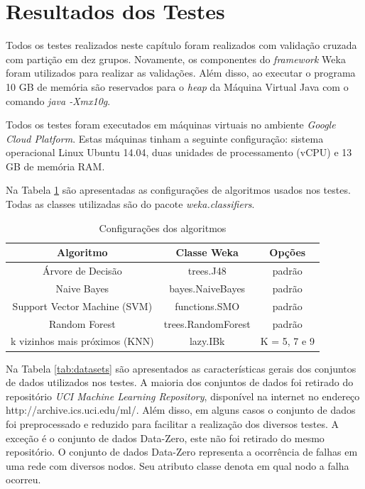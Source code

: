 \section{Resultados dos Testes}

Todos os testes realizados neste capítulo foram realizados com validação cruzada com partição em dez grupos.
Novamente, os componentes do \textit{framework} Weka foram utilizados para realizar as validações.
Além disso, ao executar o programa 10 GB de memória são reservados para o \textit{heap} da Máquina Virtual Java com o comando \textit{java -Xmx10g}.

Todos os testes foram executados em máquinas virtuais no ambiente \textit{Google Cloud Platform}. 
Estas máquinas tinham a seguinte configuração: sistema operacional Linux Ubuntu 14.04, duas unidades de processamento (vCPU) e 13 GB de memória RAM.

Na Tabela \ref{tab:algoritmostestes} são apresentadas as configurações de algoritmos usados nos testes. Todas as classes utilizadas são do pacote \textit{weka.classifiers}.

\begin{table}[h!]
  \begin{center}
    \begin{tabular}{ccc}
      \hline
      \textbf{Algoritmo} & \textbf{Classe Weka} & \textbf{Opções} \\
      \hline

      Árvore de Decisão & trees.J48 & padrão \\
      Naive Bayes & bayes.NaiveBayes & padrão \\
      Support Vector Machine (SVM) & functions.SMO & padrão \\
      Random Forest & trees.RandomForest & padrão \\
      k vizinhos mais próximos (KNN) & lazy.IBk & K = 5, 7 e 9 \\

      \hline
    \end{tabular}
    \caption{Configurações dos algoritmos}
    \label{tab:algoritmostestes}
  \end{center}
\end{table}

Na Tabela \ref{tab:datasets} são apresentados as características gerais dos conjuntos de dados utilizados nos testes.
A maioria dos conjuntos de dados foi retirado do repositório \textit{UCI Machine Learning Repository}, disponível na internet no endereço http://archive.ics.uci.edu/ml/.
Além disso, em alguns casos o conjunto de dados foi preprocessado e reduzido para facilitar a realização dos diversos testes.
A exceção é o conjunto de dados Data-Zero, este não foi retirado do mesmo repositório.
O conjunto de dados Data-Zero representa a ocorrência de falhas em uma rede com diversos nodos.
Seu atributo classe denota em qual nodo a falha ocorreu.

